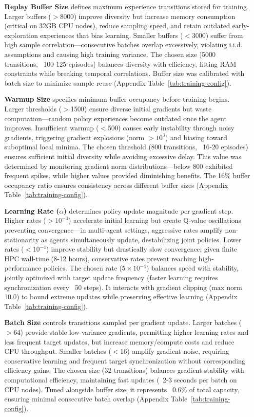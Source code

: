 \textbf{Replay Buffer Size} defines maximum experience transitions stored for training. Larger buffers ($>$8000) improve diversity but increase memory consumption (critical on 32GB CPU nodes), reduce sampling speed, and retain outdated early-exploration experiences that bias learning. Smaller buffers ($<$3000) suffer from high sample correlation—consecutive batches overlap excessively, violating i.i.d. assumptions and causing high training variance. The chosen size (5000 transitions, ~100-125 episodes) balances diversity with efficiency, fitting RAM constraints while breaking temporal correlations. Buffer size was calibrated with batch size to minimize sample reuse (Appendix Table~\ref{tab:training-config}).

\textbf{Warmup Size} specifies minimum buffer occupancy before training begins. Larger thresholds ($>$1500) ensure diverse initial gradients but waste computation—random policy experiences become outdated once the agent improves. Insufficient warmup ($<$500) causes early instability through noisy gradients, triggering gradient explosions (norm $>10^3$) and biasing toward suboptimal local minima. The chosen threshold (800 transitions, ~16-20 episodes) ensures sufficient initial diversity while avoiding excessive delay. This value was determined by monitoring gradient norm distributions—below 800 exhibited frequent spikes, while higher values provided diminishing benefits. The 16\% buffer occupancy ratio ensures consistency across different buffer sizes (Appendix Table~\ref{tab:training-config}).

\textbf{Learning Rate ($\alpha$)} determines policy update magnitude per gradient step. Higher rates ($>10^{-3}$) accelerate initial learning but create Q-value oscillations preventing convergence—in multi-agent settings, aggressive rates amplify non-stationarity as agents simultaneously update, destabilizing joint policies. Lower rates ($<10^{-4}$) improve stability but drastically slow convergence; given finite HPC wall-time (8-12 hours), conservative rates prevent reaching high-performance policies. The chosen rate ($5 \times 10^{-4}$) balances speed with stability, jointly optimized with target update frequency (faster learning requires synchronization every ~50 steps). It interacts with gradient clipping (max norm 10.0) to bound extreme updates while preserving effective learning (Appendix Table~\ref{tab:training-config}).

\textbf{Batch Size} controls transitions sampled per gradient update. Larger batches ($>$64) provide stable low-variance gradients, permitting higher learning rates and less frequent target updates, but increase memory/compute costs and reduce CPU throughput. Smaller batches ($<$16) amplify gradient noise, requiring conservative learning and frequent target synchronization without corresponding efficiency gains. The chosen size (32 transitions) balances gradient stability with computational efficiency, maintaining fast updates (~2-3 seconds per batch on CPU nodes). Tuned alongside buffer size, it represents ~0.6\% of total capacity, ensuring minimal consecutive batch overlap (Appendix Table~\ref{tab:training-config}).

